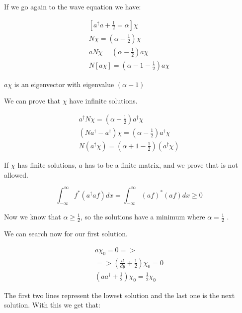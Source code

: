 If we go again to the wave equation we have:

\begin{equation}
  \begin{array}{c}
    [a^\dagger a+\frac{1}{2}=\alpha]\chi
    \\
    N\chi = \left(\alpha-\frac{1}{2}\right)\chi
    \\
    aN\chi = \left(\alpha-\frac{1}{2}\right)a\chi
    \\
    N[a\chi]=\left(\alpha-1-\frac{1}{2}\right)a\chi
  \end{array}
\end{equation}

$a\chi$ is an eigenvector with eigenvalue $(\alpha-1)$

We can prove that $\chi$ have infinite solutions.

\begin{equation}
  \begin{array}{c}
    a^\dagger N \chi = \left(\alpha - \frac{1}{2}\right)a^{\dagger}\chi
    \\
    (Na^\dagger-a^\dagger) \chi = \left(\alpha - \frac{1}{2}\right)a^{\dagger}\chi
    \\
    N(a^\dagger\chi)=\left(\alpha+1-\frac{1}{2}\right)(a^\dagger\chi)
  \end{array}
\end{equation}

If $\chi$ has finite solutions, $a$ has to be a finite matrix, and we prove that is not allowed.

\begin{equation}
  \int_{-\infty}^{\infty} f^*(a^\dagger a f)dx = \int_{-\infty}^{\infty} (af)^*(af) dx \geq 0
\end{equation}

Now we know that $\alpha \geq\frac{1}{2}$, so the solutions have a minimum where $\alpha = \frac{1}{2}$ .

We can search now for our first solution.

\begin{equation}
  \begin{array}{c}
    a\chi_0 = 0 =>
    \\
    => \left(\frac{d}{dy}+\frac{1}{2}\right)\chi_0 = 0
    \\
    \left(aa^\dagger+\frac{1}{2}\right)\chi_0 = \frac{1}{2} \chi_0
  \end{array}
\end{equation}

The first two lines represent the lowest solution and the last one is the next solution. With this we get that:

